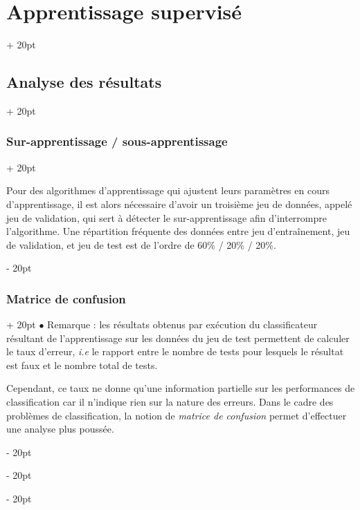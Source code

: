 \documentclass[a4paper, 12pt, twoside]{article}
\newcommand{\ind}[1][20pt]{\advance\leftskip + #1}
\newcommand{\deind}[1][20pt]{\advance\leftskip - #1}
\newenvironment{indt}[2][20pt]{#2 \par \ind[#1]}{\par \deind} %
\begin{document}
\begin{indt}{\section{Apprentissage supervisé}}
\begin{indt}{\subsection{Analyse des résultats}}
\begin{indt}{\subsubsection{Sur-apprentissage / sous-apprentissage}}
\begin{center}
                \end{center}

                Pour des algorithmes d'apprentissage qui ajustent leurs paramètres en cours d'apprentissage, il est alors nécessaire d'avoir un troisième jeu de données, appelé jeu de validation, qui sert à détecter le sur-apprentissage afin d'interrompre l'algorithme.
                Une répartition fréquente des données entre jeu d'entraînement, jeu de validation, et jeu de test est de l'ordre de 60\% / 20\% / 20\%.
            \end{indt}

            \vspace{12pt}
            
            \begin{indt}{\subsubsection{Matrice de confusion}}
                $\bullet$ Remarque : les résultats obtenus par exécution du classificateur résultant de l'apprentissage sur les données du jeu de test permettent de calculer le taux d'erreur, \textit{i.e} le rapport entre le nombre de tests pour lesquels le résultat est faux et le nombre total de tests.

                Cependant, ce taux ne donne qu'une information partielle sur les performances de classification car il n'indique rien sur la nature des erreurs.
                Dans le cadre des problèmes de classification, la notion de \emph{matrice de confusion} permet d'effectuer une analyse plus poussée.

                \vspace{12pt}
                

\end{indt}
\end{indt}
\end{indt}
\end{document}
